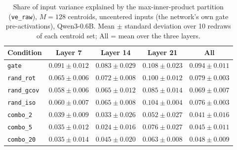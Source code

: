 \begin{table}[t]
\centering
\begin{tabular}{lcccc}
\toprule
Condition & Layer 7 & Layer 14 & Layer 21 & All \\
\midrule
\texttt{gate} & $0.091 \pm 0.012$ & $0.083 \pm 0.029$ & $0.108 \pm 0.023$ & $0.094 \pm 0.011$ \\
\addlinespace
\texttt{rand\_rot} & $0.065 \pm 0.006$ & $0.072 \pm 0.008$ & $0.100 \pm 0.012$ & $0.079 \pm 0.003$ \\
\texttt{rand\_gcov} & $0.058 \pm 0.006$ & $0.065 \pm 0.012$ & $0.085 \pm 0.014$ & $0.069 \pm 0.007$ \\
\texttt{rand\_iso} & $0.060 \pm 0.007$ & $0.065 \pm 0.008$ & $0.104 \pm 0.004$ & $0.076 \pm 0.003$ \\
\addlinespace
\texttt{combo\_2} & $0.039 \pm 0.009$ & $0.033 \pm 0.026$ & $0.052 \pm 0.027$ & $0.041 \pm 0.016$ \\
\texttt{combo\_5} & $0.035 \pm 0.012$ & $0.024 \pm 0.016$ & $0.076 \pm 0.027$ & $0.045 \pm 0.011$ \\
\texttt{combo\_20} & $0.035 \pm 0.014$ & $0.045 \pm 0.020$ & $0.063 \pm 0.008$ & $0.048 \pm 0.009$ \\
\bottomrule
\end{tabular}
\caption{Share of input variance explained by the max-inner-product partition (\texttt{ve\_raw}), $M = 128$ centroids, uncentered inputs (the network's own gate pre-activations), Qwen3-0.6B. Mean $\pm$ standard deviation over 10 redraws of each centroid set; All = mean over the three layers.}
\label{tab:ve-raw-ip-raw-M128}
\end{table}

